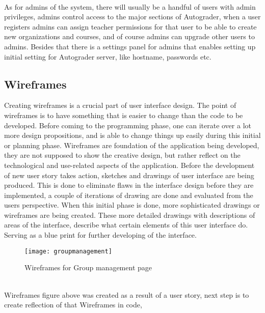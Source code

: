 \\As for admins of the system, there will usually be a handful of users with admin privileges, admins control access to the major sections of Autograder, when a user registers admins can assign teacher permissions for that user to be able to create new organizations and courses, and of course admins can upgrade other users to admins. Besides that there is a settings panel for admins that enables setting up initial setting for Autograder server, like hostname, passwords etc.
\subsection{Wireframes}
Creating wireframes is a crucial part of user interface design. The point of wireframes is to have something that is easier to change than the code to be developed. Before coming to the programming phase, one can iterate over a lot more design propositions, and is able to change things up easily during this initial or planning phase. Wireframes are foundation of the application being developed, they are not supposed to show the creative design, but rather reflect on the technological and use-related aspects of the application. Before the development of new user story takes action, sketches and drawings of user interface are being produced. This is done to eliminate flaws in the interface design before they are implemented, a couple of iterations of drawing are done and evaluated from the users perspective. When this initial phase is done, more sophisticated drawings or wireframes are being created. These more detailed drawings with descriptions of areas of the interface, describe what certain elements of this user interface do. Serving as a blue print for further developing of the interface.
\begin{figure}[h]
  {\texttt{[image: groupmanagement]}}
  \caption{Wireframes for Group management page}
  \label{fig:groupmanagement}
\end{figure}
\\Wireframes figure above was created as a result of a user story, next step is to create reflection of that Wireframes in code, 

